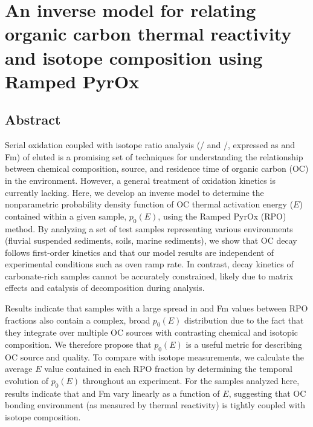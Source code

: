 \chapter{An inverse model for relating organic carbon thermal reactivity and isotope composition using Ramped PyrOx}
\label{Ch3}
\raggedbottom

{\let\thefootnote\relax{}}

\clearpage

\section{Abstract}

Serial oxidation coupled with isotope ratio analysis (/ and /, expressed as  and Fm) of eluted  is a promising set of techniques for understanding the relationship between chemical composition, source, and residence time of organic carbon (OC) in the environment. However, a general treatment of oxidation kinetics is currently lacking. Here, we develop an inverse model to determine the nonparametric probability density function of OC thermal activation energy ($E$) contained within a given sample, $p_{0}(E)$, using the Ramped PyrOx (RPO) method. By analyzing a set of test samples representing various environments (fluvial suspended sediments, soils, marine sediments), we show that OC decay follows first-order kinetics and that our model results are independent of experimental conditions such as oven ramp rate. In contrast, decay kinetics of carbonate-rich samples cannot be accurately constrained, likely due to matrix effects and catalysis of  decomposition during analysis.

Results indicate that samples with a large spread in  and Fm values between RPO fractions also contain a complex, broad $p_{0}(E)$ distribution due to the fact that they integrate over multiple OC sources with contrasting chemical and isotopic composition. We therefore propose that $p_{0}(E)$ is a useful metric for describing OC source and quality. To compare with isotope measurements, we calculate the average $E$ value contained in each RPO fraction by determining the temporal evolution of $p_{0}(E)$ throughout an experiment. For the samples analyzed here, results indicate that  and Fm vary linearly as a function of $E$, suggesting that OC bonding environment (as measured by thermal reactivity) is tightly coupled with isotope composition.

